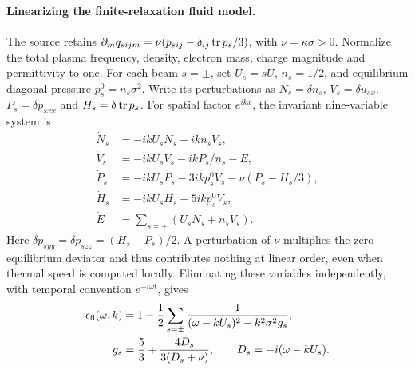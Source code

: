 \paragraph{Linearizing the finite-relaxation fluid model.}
The source retains
$\partial_mq_{sijm}=\nu(p_{sij}-\delta_{ij}\operatorname{tr} p_s/3)$,
with $\nu=\kappa\sigma>0$. Normalize the total plasma frequency, density,
electron mass, charge magnitude and permittivity to one. For each beam
$s=\pm$, set $U_s=sU$, $n_s=1/2$, and equilibrium diagonal pressure
$p_s^0=n_s\sigma^2$. Write its perturbations as
$N_s=\delta n_s$, $V_s=\delta u_{sx}$,
$P_s=\delta p_{sxx}$ and $H_s=\delta\operatorname{tr} p_s$.
For spatial factor $e^{ikx}$, the invariant nine-variable system is
\begin{align}
 \dot N_s&=-ikU_sN_s-ikn_sV_s, \nonumber\\
 \dot V_s&=-ikU_sV_s-ikP_s/n_s-E, \nonumber\\
 \dot P_s&=-ikU_sP_s-3ikp_s^0V_s-\nu(P_s-H_s/3), \nonumber\\
 \dot H_s&=-ikU_sH_s-5ikp_s^0V_s, \nonumber\\
 \dot E&=\sum_{s=\pm}(U_sN_s+n_sV_s).
 \label{eq:linear-block}
\end{align}
Here $\delta p_{syy}=\delta p_{szz}=(H_s-P_s)/2$. A perturbation of $\nu$
multiplies the zero equilibrium deviator and thus contributes nothing at
linear order, even when thermal speed is computed locally.
Eliminating these variables independently, with temporal convention
$e^{-i\omega t}$, gives
\begin{align}
 \epsilon_{\rm fl}(\omega,k)
 &=1-\frac12\sum_{s=\pm}
 \frac{1}{(\omega-kU_s)^2-k^2\sigma^2g_s}, \nonumber\\
 g_s&=\frac53+\frac{4D_s}{3(D_s+\nu)},\qquad
 D_s=-i(\omega-kU_s).
 \label{eq:fluid-dielectric}
\end{align}

